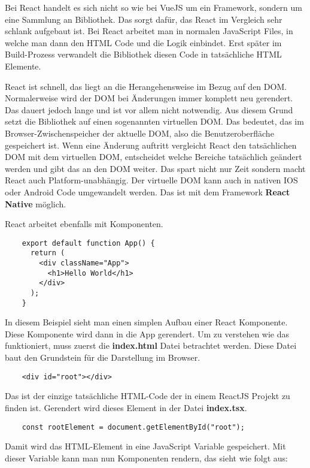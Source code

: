 Bei React handelt es sich nicht so wie bei VueJS um ein Framework, sondern um eine Sammlung an Bibliothek. Das sorgt dafür, das React im Vergleich sehr schlank aufgebaut ist. Bei React arbeitet man in normalen JavaScript Files, in welche man dann den HTML Code und die Logik einbindet. Erst später im Build-Prozess verwandelt die Bibliothek diesen Code in tatsächliche HTML Elemente. 

React ist schnell, das liegt an die Herangehensweise im Bezug auf den DOM. Normalerweise wird der DOM bei Änderungen immer komplett neu gerendert. Das dauert jedoch lange und ist vor allem nicht notwendig. Aus diesem Grund setzt die Bibliothek auf einen sogenannten virtuellen DOM. Das bedeutet, das im Browser-Zwischenspeicher der aktuelle DOM, also die Benutzeroberfläche gespeichert ist. Wenn eine Änderung auftritt vergleicht React den tatsächlichen DOM mit dem virtuellen DOM, entscheidet welche Bereiche tatsächlich geändert werden und gibt das an den DOM weiter. Das spart nicht nur Zeit sondern macht React auch Platform-unabhängig. Der virtuelle DOM kann auch in nativen IOS oder Android Code umgewandelt werden. Das ist mit dem Framework \textbf{React Native} möglich.

React arbeitet ebenfalls mit Komponenten.

\begin{lstlisting}
    export default function App() {
      return (
        <div className="App">
          <h1>Hello World</h1>
        </div>
      );
    }
\end{lstlisting}

In diesem Beispiel sieht man einen simplen Aufbau einer React Komponente. Diese Komponente wird dann in die App gerendert. Um zu verstehen wie das funktioniert, muss zuerst die \textbf{index.html} Datei betrachtet werden. Diese Datei baut den Grundstein für die Darstellung im Browser.

\begin{lstlisting}
    <div id="root"></div>
\end{lstlisting}

Das ist der einzige tatsächliche HTML-Code der in einem ReactJS Projekt zu finden ist. Gerendert wird dieses Element in der Datei \textbf{index.tsx}.

\begin{lstlisting}
    const rootElement = document.getElementById("root");
\end{lstlisting}

Damit wird das HTML-Element in eine JavaScript Variable gespeichert. Mit dieser Variable kann man nun Komponenten rendern, das sieht wie folgt aus:


